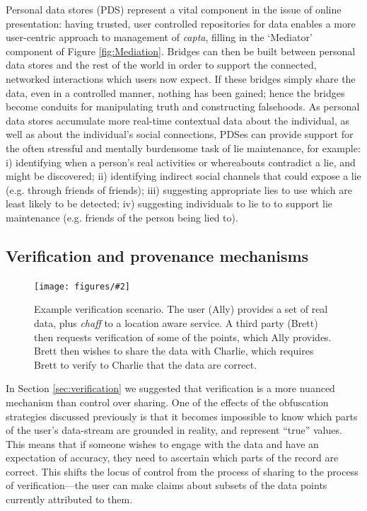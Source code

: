 \documentclass{IOS-Book-Article}     %
\newcommand{\fig}[3][0.9]{
\begin{figure}[tp]
\begin{center}
\texttt{[image: figures/\#2]}
\caption{#3}
\label{fig:#2}
\end{center}
\end{figure}
}
\begin{document}
Personal data stores (PDS) represent a vital component in the issue of online
presentation: having trusted, user controlled repositories for data
enables a more user-centric approach to management of \emph{capta}, filling in
the `Mediator' component of Figure \ref{fig:Mediation}. Bridges can then be
built between personal data stores and the rest of the world in order to support 
the connected, networked interactions
which users now expect. If these bridges simply share the data, even in a
controlled manner, nothing has been gained; hence the bridges become conduits
for manipulating truth and constructing falsehoods. As personal data stores
accumulate more real-time contextual data about the individual, as well as about
the individual's social connections, PDSes can provide support for the often
stressful and mentally burdensome task of lie maintenance, for example: i)
identifying when a person's real activities or whereabouts contradict a lie, and
might be discovered; ii) identifying indirect social channels that could expose
a lie (e.g. through friends of friends); iii) suggesting appropriate lies to use
which are least likely to be detected; iv) suggesting individuals to lie to to
support lie maintenance (e.g. friends of the person being lied to). 


\subsection{Verification and provenance mechanisms}

\fig{Verification}{Example verification scenario. The user (Ally) provides a set
of real data, plus \emph{chaff} to a location aware service. A third party
(Brett) then requests verification of some of the points, which Ally
provides. Brett then wishes to share the data with Charlie, which requires Brett
to verify to Charlie that the data are correct.}

In Section \ref{sec:verification} we suggested that verification is a more nuanced mechanism
than control over sharing.
One of the effects of the obfuscation strategies discussed
previously is that it becomes impossible to know which parts of the user's
data-stream are grounded in reality, and represent ``true'' values. This means
that if someone wishes to engage with the data and have an expectation of
accuracy, they need to ascertain which parts of the record are correct. This
shifts the locus of control from the process of sharing to the process of
verification---the user can make claims about subsets of the data points
currently attributed to them.
\end{document}
